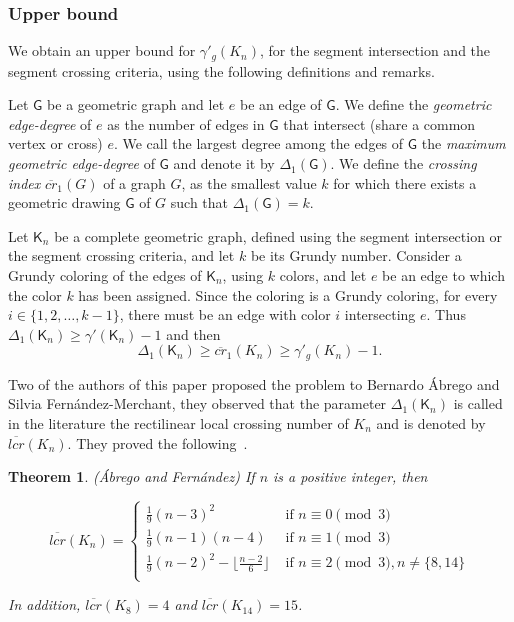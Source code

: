\documentclass[11pt]{article}
\newtheorem{theorem}{Theorem}
\begin{document}
\subsubsection{Upper bound} 

We obtain an upper bound for $\gamma'_g(K_n)$, for the segment intersection and the segment crossing criteria, using the following definitions and remarks.

Let $\mathsf{G}$ be a geometric graph and let $e$ be an edge of $\mathsf{G}$. We define the \emph{geometric edge-degree} of $e$ as the number of edges in $\mathsf{G}$ that intersect (share a common vertex or cross) $e$. We call the largest degree among the edges of $\mathsf{G}$ the \emph{maximum geometric edge-degree} of $\mathsf{G}$ and denote it by $\Delta_1(\mathsf{G})$. We define the \emph{crossing index} $\overline{cr}_1(G)$ of a graph $G$, as the smallest value $k$ for which there exists a geometric drawing $\mathsf{G}$ of $G$ such that $\Delta_1 (\mathsf{G}) = k$.


Let $\mathsf{K}_n$ be a complete geometric graph, defined using the segment intersection or the segment crossing criteria, and let $k$ be its Grundy number. Consider a Grundy coloring of the edges of $\mathsf{K}_n$, using $k$ colors, and let $e$ be an edge to which the color $k$ has been assigned. Since the coloring is a Grundy coloring, for every $i \in \{1, 2, \ldots, k-1\}$, there must be an edge with color $i$ intersecting $e$.
Thus $\Delta_1 (\mathsf{K}_n) \geq \gamma'(\mathsf{K}_n)-1$ and then
$$\Delta_1(\mathsf{K}_n)\geq\overline{cr}_1(K_n)\geq \gamma'_g(K_n)-1.$$

Two of the authors of this paper proposed the problem to Bernardo Ábrego and Silvia Fernández-Merchant, they observed that the parameter $\Delta_1(\mathsf{K}_n)$ is called in the literature the rectilinear local crossing number of $K_n$ and is denoted by $\overline{lcr}(K_n)$. They proved the following~\cite{MR3663492}.

\begin{theorem}(Ábrego and Fernández)
If $n$ is a positive integer, then %

\begin{equation*}
    \overline{lcr}(K_n) =
    \begin{cases}
        \frac{1}{9}(n-3)^2 & \text{ if } n \equiv 0 \pmod 3\\
        \frac{1}{9}(n-1)(n-4) & \text{ if } n \equiv 1 \pmod 3\\
        \frac{1}{9}(n-2)^2- \lfloor \frac{n-2}{6} \rfloor & \text{ if } n \equiv 2 \pmod 3, n \neq \{8,14\}\\
    \end{cases}
\end{equation*}

In addition, $\overline{lcr}(K_8) = 4$ and $\overline{lcr}(K_{14}) = 15$.
\end{theorem}
\end{document}
